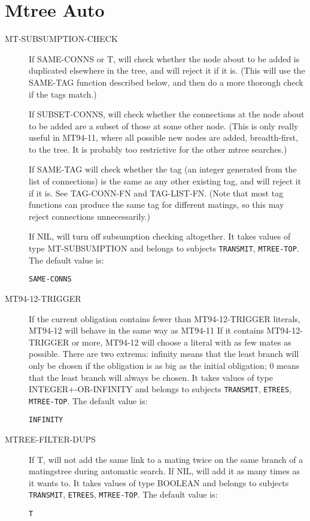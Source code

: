 \section{Mtree Auto}

\begin{description} 
\item[MT-SUBSUMPTION-CHECK]  
If SAME-CONNS or T, will check whether the node about to be added is
duplicated elsewhere in the tree, and will reject it if it is. (This will use
the SAME-TAG function described below, and then do a more thorough check if the 
tags match.)

If SUBSET-CONNS, will check whether the connections at the node about to be
added are a subset of those at some other node. (This is only really useful in
MT94-11, where all possible new nodes are added, breadth-first, to the tree.
It is probably too restrictive for the other mtree searches.)

If SAME-TAG will check whether the tag (an integer generated from the list of 
connections) is the same as any other existing tag, and will reject it if it is.
See TAG-CONN-FN and TAG-LIST-FN. (Note that most tag functions can produce the
same tag for different matings, so this may reject connections unnecessarily.)

If NIL, will turn off subsumption checking altogether.
It takes values of type MT-SUBSUMPTION and belongs to subjects \texttt{TRANSMIT}, \texttt{MTREE-TOP}.  The default value is: \begin{lstlisting}
SAME-CONNS
\end{lstlisting}

\item[MT94-12-TRIGGER]  
If the current obligation contains fewer than MT94-12-TRIGGER 
literals, MT94-12 will behave in the same way as MT94-11
If it contains MT94-12-TRIGGER or more, MT94-12 will choose a literal
with as few mates as possible. There are two extrema: infinity 
means that the least branch will only be chosen if the obligation
is as big as the initial obligation; 0 means that the least branch 
will always be chosen.
It takes values of type INTEGER+-OR-INFINITY and belongs to subjects \texttt{TRANSMIT}, \texttt{ETREES}, \texttt{MTREE-TOP}.  The default value is: \begin{lstlisting}
INFINITY
\end{lstlisting}

\item[MTREE-FILTER-DUPS]  
If T, will not add the same link to a mating twice on
the same branch of a matingstree during automatic search. If NIL,
will add it as many times as it wants to.
It takes values of type BOOLEAN and belongs to subjects \texttt{TRANSMIT}, \texttt{ETREES}, \texttt{MTREE-TOP}.  The default value is: \begin{lstlisting}
T
\end{lstlisting}


\end{description}

